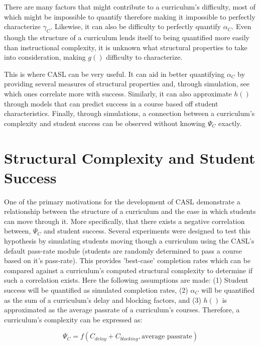 \documentclass[botnum, fleqn]{unmeethesis}
\begin{document}
    There are many factors that might contribute to a curriculum's difficulty, most of which might be impossible to quantify therefore making it impossible to perfectly characterize $\gamma_C$. Likewise, it can also be difficulty to perfectly quantify $\alpha_C$. Even though the structure of a curriculum lends itself to being quantified more easily than instructional complexity, it is unknown what structural properties to take into consideration, making $g()$ difficulty to characterize.

    This is where CASL can be very useful. It can aid in better quantifying $\alpha_C$ by providing several measures of structural properties and, through simulation, see which ones correlate more with success. Similarly, it can also approximate $h()$ through models that can predict success in a course based off student characteristics. Finally, through simulations, a connection between a curriculum's complexity and student success can be observed without knowing $\Psi_C$ exactly.


  \section{Structural Complexity and Student Success}
    One of the primary motivations for the development of CASL demonstrate a relationship between the structure of a curriculum and the ease in which students can move through it. More specifically, that there exists a negative correlation between, $\Psi_C$ and student success. Several experiments were designed to test this hypothesis by simulating students moving though a curriculum using the CASL's default pass-rate module (students are randomly determined to pass a course based on it's pass-rate). This provides 'best-case' completion rates which can be compared against a curriculum's computed structural complexity to determine if such a correlation exists. Here the following assumptions are made: (1) Student success will be quantified as simulated completion rates, (2) $\alpha_C$ will be quantified as the sum of a curriculum's delay and blocking factors, and (3) $h()$ is approximated as the average passrate of a curriculum's courses. Therefore, a curriculum's complexity can be expressed as:

    \[
      \Psi_C = f( C_{delay} + C_{blocking}, \mbox{average passrate})
    \]

\end{document}
